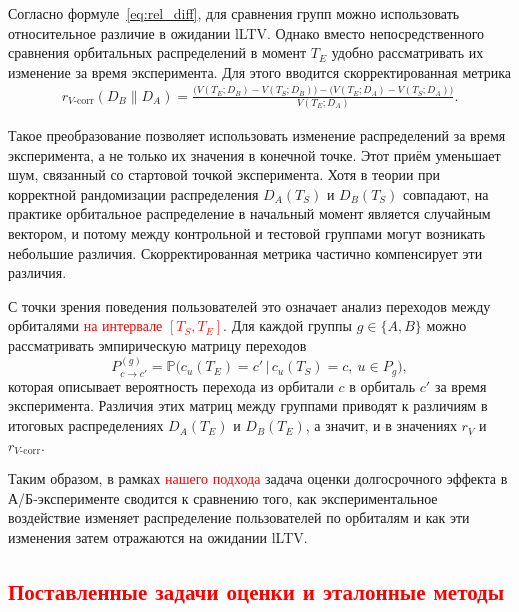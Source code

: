 Согласно формуле~\eqref{eq:rel_diff}, для сравнения групп можно
использовать относительное различие в ожидании lLTV. Однако вместо
непосредственного сравнения орбитальных распределений в момент $T_E$
удобно рассматривать их изменение за время эксперимента. Для этого
вводится скорректированная метрика
\begin{equation}
\label{eq:rel_diff_corrected}
\begin{split}
r_{V\text{-corr}}(D_B \parallel D_A)
=
\frac{\big(V(T_E; D_B) - V(T_S; D_B)\big)
-
\big(V(T_E; D_A) - V(T_S; D_A)\big)}
{V(T_E; D_A)}.
\end{split}
\end{equation}

Такое преобразование позволяет использовать изменение распределений
за время эксперимента, а не только их значения в конечной точке. Этот
приём уменьшает шум, связанный со стартовой точкой эксперимента. Хотя
в теории при корректной рандомизации распределения $D_A(T_S)$ и
$D_B(T_S)$ совпадают, на практике орбитальное распределение в начальный
момент является случайным вектором, и потому между контрольной и
тестовой группами могут возникать небольшие различия. Скорректированная
метрика частично компенсирует эти различия.

С точки зрения поведения пользователей это означает анализ переходов
между орбиталями \textcolor{red}{на интервале $[T_S, T_E]$}. Для каждой группы
$g \in \{A,B\}$ можно рассматривать эмпирическую матрицу переходов
\[
  P^{(g)}_{c \to c'} =
  \mathbb{P}\big( c_u(T_E) = c' \,\big|\, c_u(T_S) = c,\ u \in P_g \big),
\]
которая описывает вероятность перехода из орбитали $c$ в орбиталь $c'$
за время эксперимента. Различия этих матриц между группами приводят
к различиям в итоговых распределениях $D_A(T_E)$ и $D_B(T_E)$, а значит,
и в значениях $r_V$ и $r_{V\text{-corr}}$.

Таким образом, в рамках \textcolor{red}{нашего подхода} задача оценки долгосрочного
эффекта в А/Б-эксперименте сводится к сравнению того, как экспериментальное
воздействие изменяет распределение пользователей по орбиталям и как эти
изменения затем отражаются на ожидании lLTV.

\subsection{\textcolor{red}{Поставленные задачи оценки и эталонные методы}}


